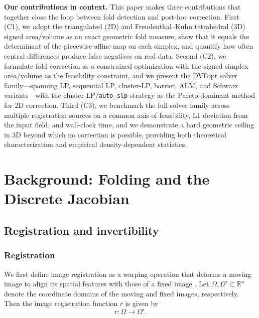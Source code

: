 \documentclass[lettersize,journal]{IEEEtran}
\begin{document}
\textbf{Our contributions in context.} This paper makes three contributions that together close the loop between fold detection and post-hoc correction. First (C1), we adopt the triangulated (2D) and Freudenthal--Kuhn tetrahedral (3D) signed area/volume as an exact geometric fold measure, show that it equals the determinant of the piecewise-affine map on each simplex, and quantify how often central differences produce false negatives on real data. Second (C2), we formulate fold correction as a constrained optimization with the signed simplex area/volume as the feasibility constraint, and we present the DVFopt solver family---spanning LP, sequential LP, cluster-LP, barrier, ALM, and Schwarz variants---with the cluster-LP/\texttt{auto\_slp} strategy as the Pareto-dominant method for 2D correction. Third (C3), we benchmark the full solver family across multiple registration sources on a common axis of feasibility, L1 deviation from the input field, and wall-clock time, and we demonstrate a hard geometric ceiling in 3D beyond which no correction is possible, providing both theoretical characterization and empirical density-dependent statistics.

\section{Background: Folding and the Discrete Jacobian}
\label{sec:background_folding_jacobian}

\subsection{Registration and invertibility}
\label{sec:registration_and_invertibility}

\subsubsection{Registration}
\label{sec:registration}

We first define image registration as a warping operation that deforms a moving image to align its spatial features with those of a fixed image \cite{Yushkevich2023}. Let $\Omega, \Omega' \subset \mathbb{R}^n$ denote the coordinate domains of the moving and fixed images, respectively. Then the image registration function $r$ is given by
\begin{equation} \label{eq:image_registration_definition}
    r: \Omega \rightarrow \Omega'.
\end{equation}
\end{document}
